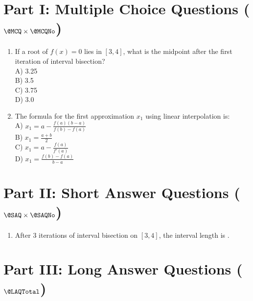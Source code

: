 \documentclass{sbs-exam}
\begin{document}
\maketitle

\examnotice

\makemarksheet

\examtools

\newpage

\makeatletter
\section*{Part I: Multiple Choice Questions ($ \@MCQ \times \@MCQNo $)}
\makeatother
\begin{enumerate}
\item
If a root of $ f(x) = 0 $ lies in $[3, 4]$, what is the midpoint after the first iteration of interval bisection?\\
A) 3.25\\
B) 3.5\\
C) 3.75\\
D) 3.0

\item 
The formula for the first approximation $ x_1 $ using linear interpolation is:\\
A) $ x_1 = a - \frac{f(a)(b-a)}{f(b)-f(a)} $\\
B) $ x_1 = \frac{a + b}{2} $\\
C) $ x_1 = a - \frac{f(a)}{f'(a)} $\\
D) $ x_1 = \frac{f(b) - f(a)}{b - a} $

\end{enumerate}

\makeatletter
\section*{Part II: Short Answer Questions ($ \text{\@SAQ} \times \@SAQNo $)}
\makeatother

\begin{enumerate}
    
\item After 3 iterations of interval bisection on $[3, 4]$, the interval length is \underline{\hspace{2cm}}.

\end{enumerate}

\makeatletter
\section*{Part III: Long Answer Questions ($ \@LAQTotal $)}
\makeatother
\end{document}
